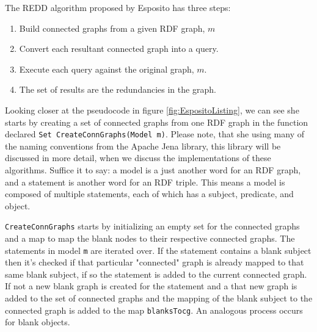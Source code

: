 The REDD algorithm proposed by Esposito has three steps: 
\begin{enumerate}

\item  Build connected graphs from a given RDF graph, $m$
\item Convert each resultant connected graph into a query.
\item  Execute each query against the original graph, $m$.
\item  The set of results are the redundancies in the graph.

\end{enumerate}
Looking closer at the pseudocode in figure \ref{fig:EspositoListing}, we can see she starts by creating a set of connected graphs from one RDF graph in the function declared \texttt{Set CreateConnGraphs(Model m)}. Please note, that she using many of the naming conventions from the Apache Jena library, this library will be discussed in more detail, when we discuss the implementations of these algorithms. Suffice it to say: a model is a just another word for an RDF graph, and a statement is another word for an RDF triple. This means a model is composed of multiple statements, each of which has a subject, predicate, and object.

\texttt{CreateConnGraphs} starts by initializing an empty set for the connected graphs and a map to map the blank nodes to their respective connected graphs. The statements in model \texttt{m} are iterated over. If the statement contains a blank subject then it's checked if that particular "connected" graph is already mapped to that same blank subject, if so the statement is added to the current connected graph. If not a new blank graph is created for the statement and a that new graph is added to the set of connected graphs and the mapping of the blank subject to the connected graph is added to the map \texttt{blanksTocg}. An analogous process occurs for blank objects. 

